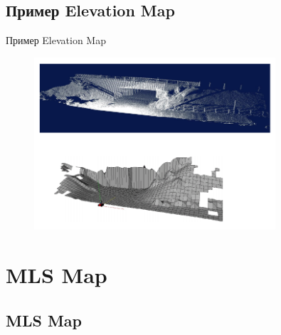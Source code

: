 \documentclass[9pt]{beamer}
\begin{document}
\subsection{Пример Elevation Map}

\begin{frame}{Пример Elevation Map}

\begin{figure}[h]
    \centering
    \includegraphics[width=0.8\textwidth]{elev_ex.png}
\end{figure}

\end{frame}

\section{MLS Map}

\subsection{MLS Map}
\end{document}

